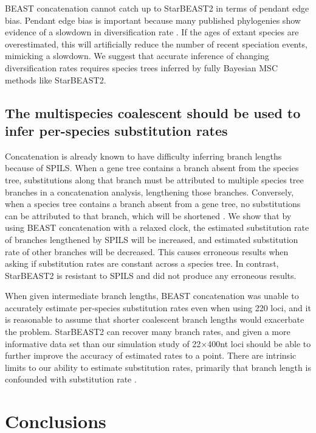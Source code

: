 \documentclass[nogrid]{MBE}%
\begin{document}
BEAST concatenation cannot catch up to StarBEAST2 in terms of pendant edge bias.
Pendant edge bias is important because many published phylogenies show evidence
of a slowdown in diversification rate \citep{Moen2014190}. If the ages of extant
species are overestimated, this will artificially reduce the number of recent
speciation events, mimicking a slowdown. We suggest that accurate inference of
changing diversification rates requires species trees inferred by fully Bayesian MSC methods
like StarBEAST2.

\subsection{The multispecies coalescent should be used to infer per-species substitution rates}

Concatenation is already known to have difficulty inferring branch lengths
because of SPILS. When a gene tree contains a branch absent from the species
tree, substitutions along that branch must be attributed to multiple species tree
branches in a concatenation analysis, lengthening those branches. Conversely,
when a species tree contains a branch absent from a gene tree, no substitutions
can be attributed to that branch, which will be shortened \citep{Mendes01072016}.
We show that by using BEAST concatenation with a relaxed
clock, the estimated substitution rate of branches lengthened by
SPILS will be increased, and estimated substitution rate of other
branches will be decreased. This causes erroneous results when asking if substitution rates
are constant across a species tree. In contrast, StarBEAST2 is resistant to
SPILS and did not produce any erroneous results.

When given intermediate branch lengths, BEAST concatenation was unable to accurately
estimate per-species substitution rates even when using 220 loci, and it is
reasonable to assume that shorter coalescent branch lengths would
exacerbate the problem. StarBEAST2 can recover many branch rates, and given a
more informative data set than our simulation study of 22$\times$400nt loci
should be able to further improve the accuracy of estimated rates to a point.
There are intrinsic limits to our ability to estimate substitution rates,
primarily that branch length is confounded with substitution rate
\citep{Thorne01092002}.

\section{Conclusions}
\end{document}
